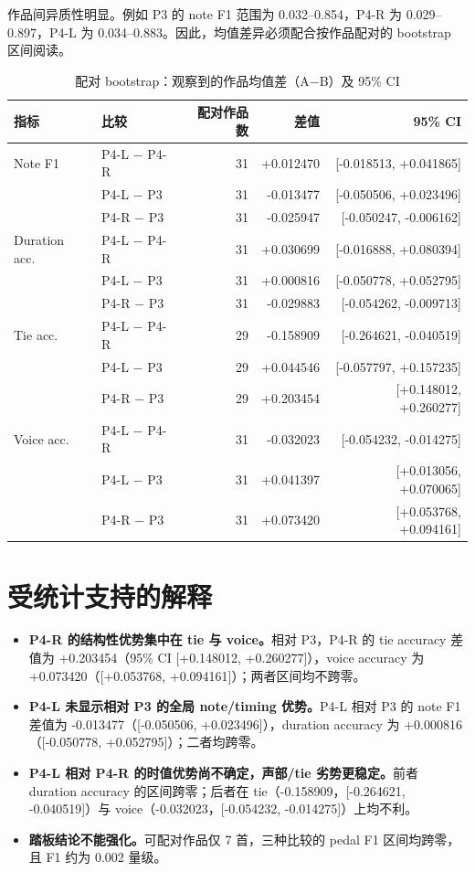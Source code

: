 \documentclass[UTF8,a4paper,11pt]{ctexart}
\begin{document}
作品间异质性明显。例如 P3 的 note F1 范围为 0.032--0.854，P4-R 为 0.029--0.897，P4-L 为 0.034--0.883。因此，均值差异必须配合按作品配对的 bootstrap 区间阅读。

\begin{table}[h]
\centering
\caption{配对 bootstrap：观察到的作品均值差（A$-$B）及 95\% CI}
\small
\begin{tabular}{@{}llrrr@{}}
\toprule
指标 & 比较 & 配对作品数 & 差值 & 95\% CI\\
\midrule
Note F1 & P4-L $-$ P4-R & 31 & +0.012470 & [-0.018513, +0.041865]\\
 & P4-L $-$ P3 & 31 & -0.013477 & [-0.050506, +0.023496]\\
 & P4-R $-$ P3 & 31 & -0.025947 & [-0.050247, -0.006162]\\
\addlinespace
Duration acc. & P4-L $-$ P4-R & 31 & +0.030699 & [-0.016888, +0.080394]\\
 & P4-L $-$ P3 & 31 & +0.000816 & [-0.050778, +0.052795]\\
 & P4-R $-$ P3 & 31 & -0.029883 & [-0.054262, -0.009713]\\
\addlinespace
Tie acc. & P4-L $-$ P4-R & 29 & -0.158909 & [-0.264621, -0.040519]\\
 & P4-L $-$ P3 & 29 & +0.044546 & [-0.057797, +0.157235]\\
 & P4-R $-$ P3 & 29 & +0.203454 & [+0.148012, +0.260277]\\
\addlinespace
Voice acc. & P4-L $-$ P4-R & 31 & -0.032023 & [-0.054232, -0.014275]\\
 & P4-L $-$ P3 & 31 & +0.041397 & [+0.013056, +0.070065]\\
 & P4-R $-$ P3 & 31 & +0.073420 & [+0.053768, +0.094161]\\
\bottomrule
\end{tabular}
\end{table}

\section{受统计支持的解释}
\begin{itemize}
  \item \textbf{P4-R 的结构性优势集中在 tie 与 voice。}相对 P3，P4-R 的 tie accuracy 差值为 +0.203454（95\% CI [+0.148012, +0.260277]），voice accuracy 为 +0.073420（[+0.053768, +0.094161]）；两者区间均不跨零。
  \item \textbf{P4-L 未显示相对 P3 的全局 note/timing 优势。}P4-L 相对 P3 的 note F1 差值为 -0.013477（[-0.050506, +0.023496]），duration accuracy 为 +0.000816（[-0.050778, +0.052795]）；二者均跨零。
  \item \textbf{P4-L 相对 P4-R 的时值优势尚不确定，声部/tie 劣势更稳定。}前者 duration accuracy 的区间跨零；后者在 tie（-0.158909，[-0.264621, -0.040519]）与 voice（-0.032023，[-0.054232, -0.014275]）上均不利。
  \item \textbf{踏板结论不能强化。}可配对作品仅 7 首，三种比较的 pedal F1 区间均跨零，且 F1 约为 0.002 量级。
\end{itemize}
\end{document}
